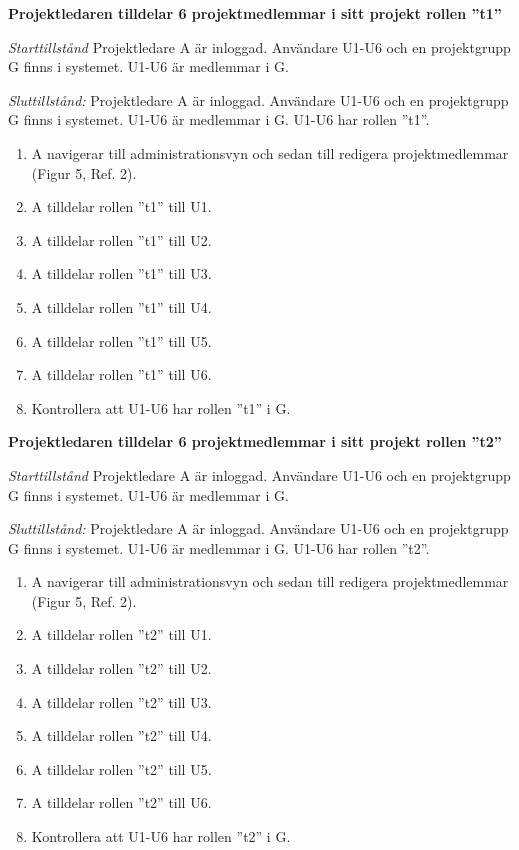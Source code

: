 \documentclass[a4paper]{article}
\begin{document}
\begin{FT}
\item
\textbf{Projektledaren tilldelar 6 projektmedlemmar i sitt projekt rollen ''t1''}

\emph{Starttillstånd} Projektledare A är inloggad. Användare U1-U6 och en projektgrupp G finns i systemet. U1-U6 är medlemmar i G.

\emph{Sluttillstånd:} Projektledare A är inloggad. Användare U1-U6 och en projektgrupp G finns i systemet. U1-U6 är medlemmar i G. U1-U6 har rollen ''t1''.

\begin{enumerate}
\item A navigerar till administrationsvyn och sedan till redigera projektmedlemmar (Figur 5, Ref. 2).
\item A tilldelar rollen ''t1'' till U1.
\item A tilldelar rollen ''t1'' till U2.
\item A tilldelar rollen ''t1'' till U3.
\item A tilldelar rollen ''t1'' till U4.
\item A tilldelar rollen ''t1'' till U5.
\item A tilldelar rollen ''t1'' till U6.
\item Kontrollera att U1-U6 har rollen ''t1'' i G.
\end{enumerate}

\item
\textbf{Projektledaren tilldelar 6 projektmedlemmar i sitt projekt rollen ''t2''}

\emph{Starttillstånd} Projektledare A är inloggad. Användare U1-U6 och en projektgrupp G finns i systemet. U1-U6 är medlemmar i G.

\emph{Sluttillstånd:} Projektledare A är inloggad. Användare U1-U6 och en projektgrupp G finns i systemet. U1-U6 är medlemmar i G. U1-U6 har rollen ''t2''.

\begin{enumerate}
\item A navigerar till administrationsvyn och sedan till redigera projektmedlemmar (Figur 5, Ref. 2).
\item A tilldelar rollen ''t2'' till U1.
\item A tilldelar rollen ''t2'' till U2.
\item A tilldelar rollen ''t2'' till U3.
\item A tilldelar rollen ''t2'' till U4.
\item A tilldelar rollen ''t2'' till U5.
\item A tilldelar rollen ''t2'' till U6.
\item Kontrollera att U1-U6 har rollen ''t2'' i G.
\end{enumerate}


\end{FT}
\end{document}
